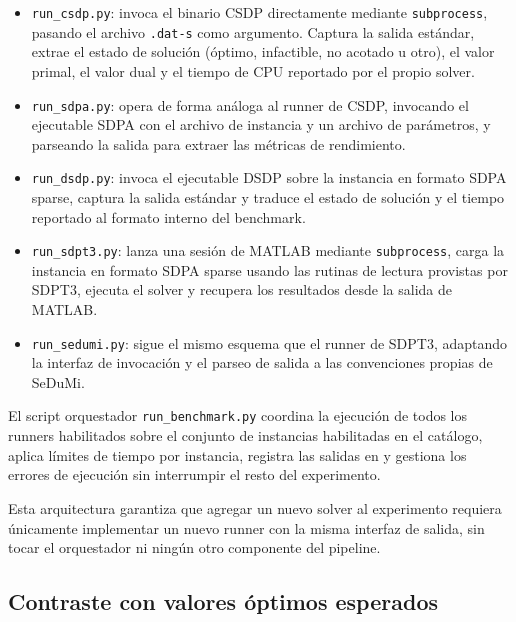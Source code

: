 \begin{itemize}
    \item \texttt{run\_csdp.py}: invoca el binario CSDP directamente mediante
    \texttt{subprocess}, pasando el archivo \texttt{.dat-s} como argumento.
    Captura la salida estándar, extrae el estado de solución (óptimo, infactible,
    no acotado u otro), el valor primal, el valor dual y el tiempo de CPU reportado
    por el propio solver.

    \item \texttt{run\_sdpa.py}: opera de forma análoga al runner de CSDP, invocando
    el ejecutable SDPA con el archivo de instancia y un archivo de parámetros,
    y parseando la salida para extraer las métricas de rendimiento.

    \newpage
    \item \texttt{run\_dsdp.py}: invoca el ejecutable DSDP sobre la instancia en
    formato SDPA sparse, captura la salida estándar y traduce el estado de solución y
    el tiempo reportado al formato interno del benchmark.

    \item \texttt{run\_sdpt3.py}: lanza una sesión de MATLAB mediante
    \texttt{subprocess}, carga la instancia en formato SDPA sparse usando las
    rutinas de lectura provistas por SDPT3, ejecuta el solver y recupera los
    resultados desde la salida de MATLAB.

    \item \texttt{run\_sedumi.py}: sigue el mismo esquema que el runner de SDPT3,
    adaptando la interfaz de invocación y el parseo de salida a las convenciones
    propias de SeDuMi.
\end{itemize}

El script orquestador \texttt{run\_benchmark.py} coordina la ejecución de todos los
runners habilitados sobre el conjunto de instancias habilitadas en el catálogo, aplica límites de
tiempo por instancia, registra las salidas en  y gestiona
los errores de ejecución sin interrumpir el resto del experimento.

Esta arquitectura garantiza que agregar un nuevo solver al experimento requiera
únicamente implementar un nuevo runner con la misma interfaz de salida, sin tocar
el orquestador ni ningún otro componente del pipeline.

\subsection{Contraste con valores óptimos esperados}
\label{subsec:avance_solvers_contraste}

